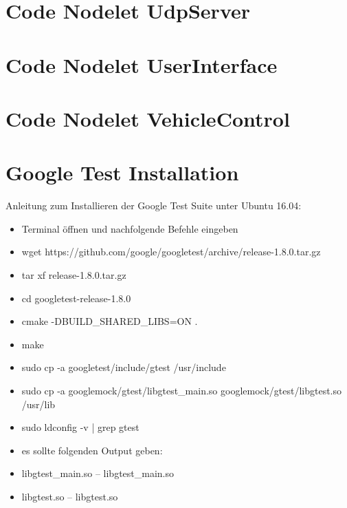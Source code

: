 \documentclass[a4paper, 12pt, titlepage]{scrartcl}
\begin{document}
{\begin{appendices}
\section{Code Nodelet UdpServer}
\lstset{style=customcpp,inputpath=../modules/platooning_ws/src/platooning/include/platooning}

\lstset{style=customcpp,inputpath=../modules/platooning_ws/src/platooning/src}

\section{Code Nodelet UserInterface}
\lstset{style=customcpp,inputpath=../modules/platooning_ws/src/platooning/include/platooning}

\lstset{style=customcpp,inputpath=../modules/platooning_ws/src/platooning/src}

\section{Code Nodelet VehicleControl}
\lstset{style=customcpp,inputpath=../modules/platooning_ws/src/platooning/include/platooning}

\lstset{style=customcpp,inputpath=../modules/platooning_ws/src/platooning/src}


\section{Google Test Installation}
\label{appendix:gtest_install}
	Anleitung zum Installieren der Google Test Suite unter Ubuntu 16.04:
	\begin{itemize}
		\item Terminal öffnen und nachfolgende Befehle eingeben
		\item wget https://github.com/google/googletest/archive/release-1.8.0.tar.gz
		\item tar xf release-1.8.0.tar.gz
		\item cd googletest-release-1.8.0
		\item cmake -DBUILD\_SHARED\_LIBS=ON .
		\item make
		\item sudo cp -a googletest/include/gtest /usr/include
		\item sudo cp -a googlemock/gtest/libgtest\_main.so googlemock/gtest/libgtest.so /usr/lib
		\item sudo ldconfig -v | grep gtest
		\item es sollte folgenden Output geben:
		\item libgtest\_main.so -- libgtest\_main.so
		\item libgtest.so -- libgtest.so
	\end{itemize}
\newpage

\end{appendices}}
\end{document}

